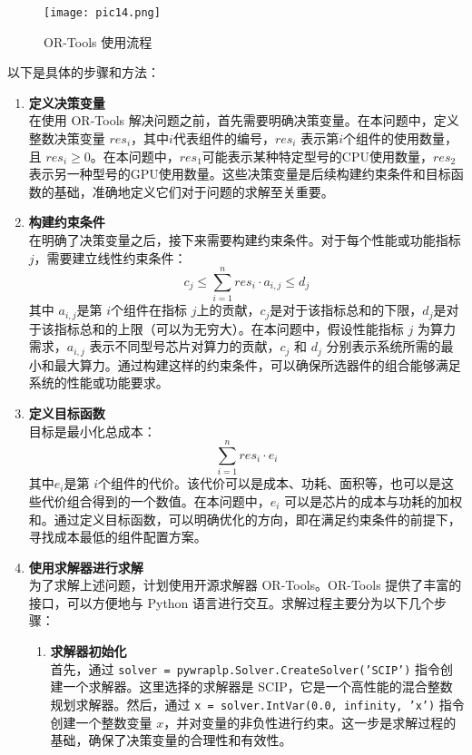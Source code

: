 \documentclass[bachelor]{thesis-uestc}
\begin{document}
\begin{figure}[h]
    \texttt{[image: pic14.png]}
    \caption{OR-Tools 使用流程}
    \label{pic14}
\end{figure}

以下是具体的步骤和方法：
\begin{enumerate}
    \item \textbf{定义决策变量}\\
    在使用 OR-Tools 解决问题之前，首先需要明确决策变量。在本问题中，定义整数决策变量 $res_i$，其中$i$代表组件的编号，$res_i$ 表示第$i$个组件的使用数量，且 $res_i \geq 0$。在本问题中，$res_1$可能表示某种特定型号的CPU使用数量，$res_2$ 表示另一种型号的GPU使用数量。这些决策变量是后续构建约束条件和目标函数的基础，准确地定义它们对于问题的求解至关重要。
    
    \item \textbf{构建约束条件}\\
    在明确了决策变量之后，接下来需要构建约束条件。对于每个性能或功能指标 $j$，需要建立线性约束条件：
    \begin{equation}
    c_j \leq \sum_{i=1}^n res_i \cdot a_{i,j} \leq d_j
    \end{equation}
    其中 $a_{i,j}$是第 $i$个组件在指标 $j$上的贡献，$c_j$是对于该指标总和的下限，$d_j$是对于该指标总和的上限（可以为无穷大）。在本问题中，假设性能指标 $j$ 为算力需求，$a_{i,j}$ 表示不同型号芯片对算力的贡献，$c_j$ 和 $d_j$ 分别表示系统所需的最小和最大算力。通过构建这样的约束条件，可以确保所选器件的组合能够满足系统的性能或功能要求。
    
    \item \textbf{定义目标函数}\\
    目标是最小化总成本：
    \begin{equation}
    \sum_{i=1}^n res_i \cdot e_i
    \end{equation}
    其中$e_i$是第 $i$个组件的代价。该代价可以是成本、功耗、面积等，也可以是这些代价组合得到的一个数值。在本问题中，$e_i$ 可以是芯片的成本与功耗的加权和。通过定义目标函数，可以明确优化的方向，即在满足约束条件的前提下，寻找成本最低的组件配置方案。
    
    \item \textbf{使用求解器进行求解}\\
    为了求解上述问题，计划使用开源求解器 OR-Tools。OR-Tools 提供了丰富的接口，可以方便地与 Python 语言进行交互。求解过程主要分为以下几个步骤：
    \begin{enumerate}
        \item \textbf{求解器初始化}\\
        首先，通过 \texttt{solver = pywraplp.Solver.CreateSolver('SCIP')} 指令创建一个求解器。这里选择的求解器是 SCIP，它是一个高性能的混合整数规划求解器。然后，通过 \texttt{x = solver.IntVar(0.0, infinity, 'x')} 指令创建一个整数变量 $x$，并对变量的非负性进行约束。这一步是求解过程的基础，确保了决策变量的合理性和有效性。
        

\end{enumerate}
\end{enumerate}
\end{document}
